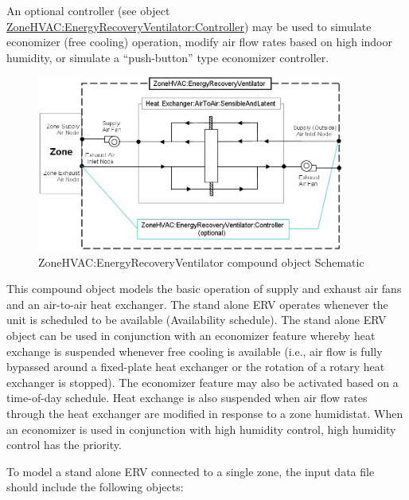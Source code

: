An optional controller (see object \hyperref[zonehvacenergyrecoveryventilatorcontroller]{ZoneHVAC:EnergyRecoveryVentilator:Controller}) may be used to simulate economizer (free cooling) operation, modify air flow rates based on high indoor humidity, or simulate a ``push-button'' type economizer controller.

\begin{figure}[hbtp] %
\centering
\includegraphics[width=0.9\textwidth, height=0.9\textheight, keepaspectratio=true]{media/image293.png}
\caption{ZoneHVAC:EnergyRecoveryVentilator compound object Schematic \protect \label{fig:zonehvac-energyrecoveryventilator-compound}}
\end{figure}

This compound object models the basic operation of supply and exhaust air fans and an air-to-air heat exchanger. The stand alone ERV operates whenever the unit is scheduled to be available (Availability schedule). The stand alone ERV object can be used in conjunction with an economizer feature whereby heat exchange is suspended whenever free cooling is available (i.e., air flow is fully bypassed around a fixed-plate heat exchanger or the rotation of a rotary heat exchanger is stopped). The economizer feature may also be activated based on a time-of-day schedule. Heat exchange is also suspended when air flow rates through the heat exchanger are modified in response to a zone humidistat. When an economizer is used in conjunction with high humidity control, high humidity control has the priority.

To model a stand alone ERV connected to a single zone, the input data file should include the following objects:

